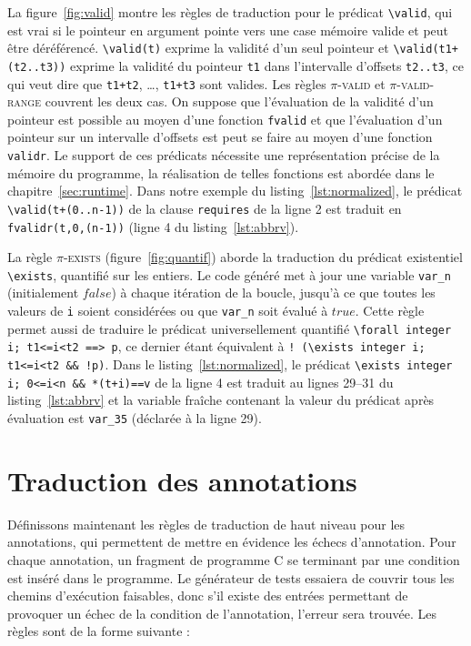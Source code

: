 La figure~\ref{fig:valid} montre les règles de traduction pour le prédicat
\lstinline|\valid|, qui est vrai si le pointeur en argument pointe vers une
case mémoire valide et peut être déréférencé.
\lstinline'\valid(t)' exprime la validité d'un seul pointeur et
\lstinline'\valid(t1+(t2..t3))' exprime la validité du pointeur \lstinline't1'
dans l'intervalle d'offsets \lstinline't2..t3', ce qui veut dire que
\lstinline't1+t2', \dots, \lstinline't1+t3' sont valides.
Les règles \textsc{$\pi$-valid} et \textsc{$\pi$-valid-range} couvrent les deux
cas.
On suppose que l'évaluation de la validité d'un pointeur est possible au moyen
d'une fonction \lstinline'fvalid' et que l'évaluation d'un pointeur sur un
intervalle d'offsets est peut se faire au moyen d'une fonction
\lstinline'validr'.
Le support de ces prédicats nécessite une représentation précise de la mémoire
du programme, la réalisation de telles fonctions est abordée dans le
chapitre~\ref{sec:runtime}.
Dans notre exemple du listing~\ref{lst:normalized}, le prédicat
\lstinline|\valid(t+(0..n-1))| de la clause \lstinline|requires| de la ligne 2
est traduit en \lstinline[style=c]|fvalidr(t,0,(n-1))| (ligne 4 du
listing~\ref{lst:abbrv}).

La règle \textsc{$\pi$-exists} (figure~\ref{fig:quantif}) aborde la traduction
du prédicat existentiel \lstinline'\exists', quantifié sur les entiers.
Le code généré met à jour une variable \lstinline'var_n' (initialement $false$)
à chaque itération de la boucle, jusqu'à ce que toutes les valeurs de
\lstinline'i' soient considérées ou que \lstinline'var_n' soit évalué à $true$.
Cette règle permet aussi de traduire le prédicat universellement quantifié
\lstinline{\forall integer i; t1<=i<t2 ==> p}, ce dernier étant équivalent à
\lstinline{! (\exists integer i; t1<=i<t2 && !p)}.
Dans le listing~\ref{lst:normalized}, le prédicat
\lstinline{\exists integer i; 0<=i<n && *(t+i)==v} de la ligne 4 est traduit
au lignes 29--31 du listing~\ref{lst:abbrv} et la variable fraîche contenant la
valeur du prédicat après évaluation est \lstinline|var_35| (déclarée à la
ligne 29).


\section{Traduction des annotations \eacsl}
\label{sec:annot}


Définissons maintenant les règles de traduction de haut niveau pour les
annotations, qui permettent de mettre en évidence les échecs d'annotation.
Pour chaque annotation, un fragment de programme C se terminant par une
condition est inséré dans le programme.
Le générateur de tests essaiera de couvrir tous les chemins d'exécution
faisables, donc s'il existe des entrées permettant de provoquer un échec de la
condition de l'annotation, l'erreur sera trouvée.
Les règles sont de la forme suivante :


